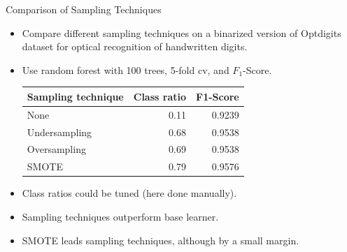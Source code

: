\documentclass[11pt,compress,t,notes=noshow, xcolor=table]{beamer}
\begin{document}
\begin{frame}{Comparison of Sampling Techniques}

    \begin{itemize}
    
        \item Compare different sampling techniques on a binarized version of Optdigits dataset for optical recognition of handwritten digits.
    
        \item Use random forest with 100 trees, 5-fold cv, and $F_1$-Score. %
           \begin{center}
             \begin{tabular}{lrr}
             \toprule
             Sampling technique & Class ratio &F1-Score\\
             \midrule
             None & 0.11 &0.9239\\
             Undersampling & 0.68 & 0.9538\\
             Oversampling & 0.69& 0.9538\\
             SMOTE & 0.79 & 0.9576\\
             \bottomrule
             \end{tabular}    
            \end{center}
            
        \item Class ratios could be tuned (here done manually).
        \item Sampling techniques outperform base learner. 
        \item SMOTE leads sampling techniques, although by a small margin.

    \end{itemize}		

\end{frame}


\endlecture
\end{document}
